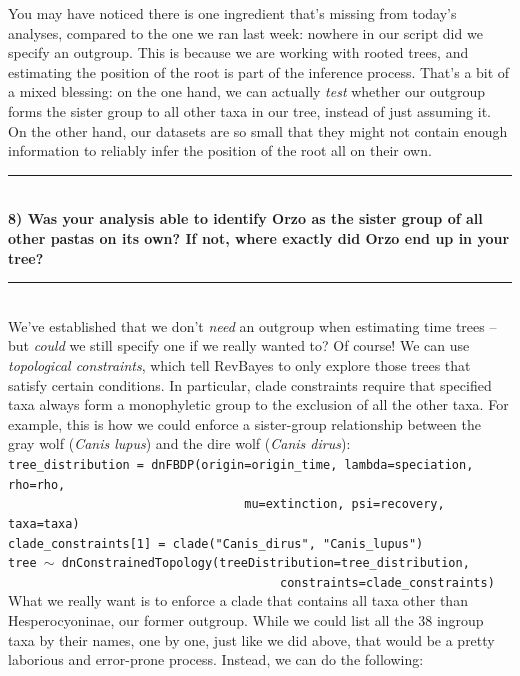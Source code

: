 \documentclass[12pt]{article}
\begin{document}
\newpage

\noindent You may have noticed there is one ingredient that's missing from today's analyses, compared to the one we ran last week: nowhere in our script did we specify an outgroup. This is because we are working with rooted trees, and estimating the position of the root is part of the inference process. That's a bit of a mixed blessing: on the one hand, we can actually \textit{test} whether our outgroup forms the sister group to all other taxa in our tree, instead of just assuming it. On the other hand, our datasets are so small that they might not contain enough information to reliably infer the position of the root all on their own. \\

\hrule
\ \\[1ex]
\textbf{8) Was your analysis able to identify Orzo as the sister group of all other pastas on its own? If not, where exactly did Orzo end up in your tree?} \\
\hrule
\ \\[1ex]
\noindent We've established that we don't \textit{need} an outgroup when estimating time trees -- but \textit{could} we still specify one if we really wanted to? Of course! We can use \textit{topological constraints}, which tell RevBayes to only explore those trees that satisfy certain conditions. In particular, clade constraints require that specified taxa always form a monophyletic group to the exclusion of all the other taxa. For example, this is how we could enforce a sister-group relationship between the gray wolf (\textit{Canis lupus}) and the dire wolf (\textit{Canis dirus}): \\

\indent \texttt{tree\_distribution = dnFBDP(origin=origin\_time, lambda=speciation, rho=rho,} \\
\indent \texttt{\ \ \ \ \ \ \ \ \ \ \ \ \ \ \ \ \ \ \ \ \ \ \ \ \ \ \ \ \ \ \ \ \ mu=extinction, psi=recovery, taxa=taxa)} \\
\indent \texttt{clade\_constraints[1] = clade("Canis\_dirus", "Canis\_lupus")} \\
\indent \texttt{tree {\footnotesize $\sim$} dnConstrainedTopology(treeDistribution=tree\_distribution,} \\
\indent \texttt{\ \ \ \,\ \ \ \ \ \ \ \ \ \ \ \ \ \ \ \ \ \ \ \ \ \ \ \ \ \ \ \ \ \ \ \,\,\ constraints=clade\_constraints)} \\

\noindent What we really want is to enforce a clade that contains all taxa other than Hesperocyoninae, our former outgroup. While we could list all the 38 ingroup taxa by their names, one by one, just like we did above, that would be a pretty laborious and error-prone process. Instead, we can do the following: \\
\end{document}
